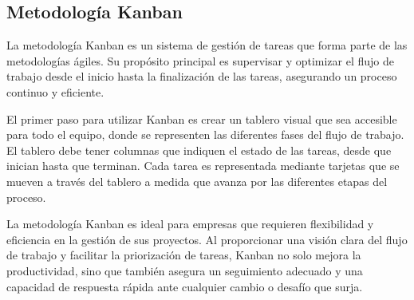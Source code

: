 \subsection{Metodología Kanban}
La metodología Kanban es un sistema de gestión de tareas que forma parte de las metodologías ágiles. Su propósito principal es supervisar y optimizar el flujo de trabajo desde el inicio hasta la finalización de las tareas, asegurando un proceso continuo y eficiente.

El primer paso para utilizar Kanban es crear un tablero visual que sea accesible para todo el equipo, donde se representen las diferentes fases del flujo de trabajo. El tablero debe tener columnas que indiquen el estado de las tareas, desde que inician hasta que terminan. Cada tarea es representada mediante tarjetas que se mueven a través del tablero a medida que avanza por las diferentes etapas del proceso.

La metodología Kanban es ideal para empresas que requieren flexibilidad y eficiencia en la gestión de sus proyectos. Al proporcionar una visión clara del flujo de trabajo y facilitar la priorización de tareas, Kanban no solo mejora la productividad, sino que también asegura un seguimiento adecuado y una capacidad de respuesta rápida ante cualquier cambio o desafío que surja.